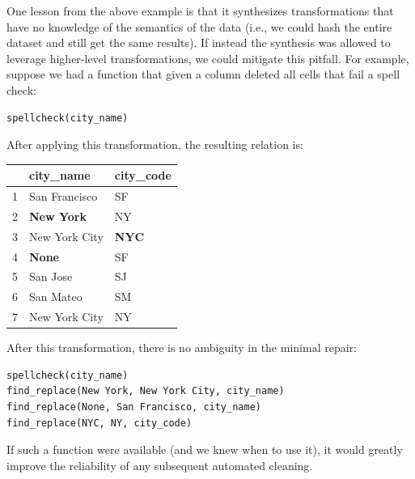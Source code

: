 One lesson from the above example is that it synthesizes transformations that have no knowledge of the semantics of the data (i.e., we could hash the entire dataset and still get the same results).
If instead the synthesis was allowed to leverage higher-level transformations, we could mitigate this pitfall.
For example, suppose we had a function that given a column deleted all cells that fail a spell check:
\begin{lstlisting}
spellcheck(city_name)
\end{lstlisting}
After applying this transformation, the resulting relation is:
\begin{table}[ht!]
\centering
\label{my-label}
\begin{tabular}{|l|l|l|}
\hline
\rowcolor[HTML]{000000} 
& {\color[HTML]{FFFFFF} city\_name}            & {\color[HTML]{FFFFFF} city\_code}   \\ \hline
1 & San Francisco                                & SF                                  \\ \hline
2& {\color[HTML]{FE0000} \textbf{New York}}     & NY                                  \\ \hline
3 & New York City                                & {\color[HTML]{FE0000} \textbf{NYC}} \\ \hline
4 & {\color[HTML]{005500} \textbf{None}} & SF                                  \\ \hline
5 & San Jose                                     & SJ                                  \\ \hline
6 & San Mateo                                    & SM                                  \\ \hline
7 & New York City                                & NY                                  \\ \hline
\end{tabular}
\end{table}

After this transformation, there is no ambiguity in the minimal repair:
\begin{lstlisting}
spellcheck(city_name)
find_replace(New York, New York City, city_name)
find_replace(None, San Francisco, city_name)
find_replace(NYC, NY, city_code)
\end{lstlisting}
If such a function were available (and we knew when to use it), it would greatly improve the reliability of any subsequent automated cleaning.

